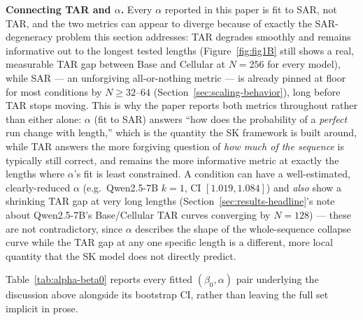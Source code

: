 \documentclass[11pt]{article}
\begin{document}
\textbf{Connecting TAR and $\alpha$.} Every $\alpha$ reported in this paper is fit to SAR, not TAR, and the two metrics can appear to diverge because of exactly the SAR-degeneracy problem this section addresses: TAR degrades smoothly and remains informative out to the longest tested lengths (Figure~\ref{fig:fig1B} still shows a real, measurable TAR gap between Base and Cellular at $N=256$ for every model), while SAR --- an unforgiving all-or-nothing metric --- is already pinned at floor for most conditions by $N\geq32$--$64$ (Section~\ref{sec:scaling-behavior}), long before TAR stops moving. This is why the paper reports both metrics throughout rather than either alone: $\alpha$ (fit to SAR) answers ``how does the probability of a \emph{perfect} run change with length,'' which is the quantity the SK framework is built around, while TAR answers the more forgiving question of \emph{how much of the sequence} is typically still correct, and remains the more informative metric at exactly the lengths where $\alpha$'s fit is least constrained. A condition can have a well-estimated, clearly-reduced $\alpha$ (e.g.\ Qwen2.5-7B $k=1$, CI $[1.019, 1.084]$) and \emph{also} show a shrinking TAR gap at very long lengths (Section~\ref{sec:results-headline}'s note about Qwen2.5-7B's Base/Cellular TAR curves converging by $N=128$) --- these are not contradictory, since $\alpha$ describes the shape of the whole-sequence collapse curve while the TAR gap at any one specific length is a different, more local quantity that the SK model does not directly predict.

Table~\ref{tab:alpha-beta0} reports every fitted $(\beta_0, \alpha)$ pair underlying the discussion above alongside its bootstrap CI, rather than leaving the full set implicit in prose.
\end{document}
